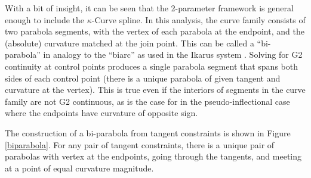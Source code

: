 \documentclass{article}
\newcommand{\kcurve}{$\kappa$-Curve}
\begin{document}
With a bit of insight, it can be seen that the 2-parameter framework is general enough to include the \kcurve{} spline. In this analysis, the curve family consists of two parabola segments, with the vertex of each parabola at the endpoint, and the (absolute) curvature matched at the join point. This can be called a ``bi-parabola'' in analogy to the ``biarc'' as used in the Ikarus system \cite{Karow87}. Solving for G2 continuity at control points produces a single parabola segment that spans both sides of each control point (there is a unique parabola of given tangent and curvature at the vertex). This is true even if the interiors of segments in the curve family are not G2 continuous, as is the case for in the pseudo-inflectional case where the endpoints have curvature of opposite sign.

The construction of a bi-parabola from tangent constraints is shown in Figure \ref{biparabola}. For any pair of tangent constraints, there is a unique pair of parabolas with vertex at the endpoints, going through the tangents, and meeting at a point of equal curvature magnitude.
\end{document}
